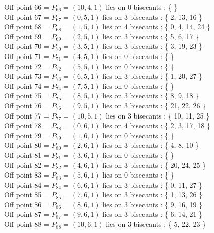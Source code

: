 \documentclass{article}
\begin{document}
{Off point 66 = $P_{66} = ( 10, 4, 1 )$ lies on 0 bisecants : \{  \}\\
Off point 67 = $P_{67} = ( 0, 5, 1 )$ lies on 3 bisecants : \{ 2, 13, 16 \}\\
Off point 68 = $P_{68} = ( 1, 5, 1 )$ lies on 4 bisecants : \{ 0, 4, 14, 24 \}\\
Off point 69 = $P_{69} = ( 2, 5, 1 )$ lies on 3 bisecants : \{ 5, 6, 17 \}\\
Off point 70 = $P_{70} = ( 3, 5, 1 )$ lies on 3 bisecants : \{ 3, 19, 23 \}\\
Off point 71 = $P_{71} = ( 4, 5, 1 )$ lies on 0 bisecants : \{  \}\\
Off point 72 = $P_{72} = ( 5, 5, 1 )$ lies on 0 bisecants : \{  \}\\
Off point 73 = $P_{73} = ( 6, 5, 1 )$ lies on 3 bisecants : \{ 1, 20, 27 \}\\
Off point 74 = $P_{74} = ( 7, 5, 1 )$ lies on 0 bisecants : \{  \}\\
Off point 75 = $P_{75} = ( 8, 5, 1 )$ lies on 3 bisecants : \{ 8, 9, 18 \}\\
Off point 76 = $P_{76} = ( 9, 5, 1 )$ lies on 3 bisecants : \{ 21, 22, 26 \}\\
Off point 77 = $P_{77} = ( 10, 5, 1 )$ lies on 3 bisecants : \{ 10, 11, 25 \}\\
Off point 78 = $P_{78} = ( 0, 6, 1 )$ lies on 4 bisecants : \{ 2, 3, 17, 18 \}\\
Off point 79 = $P_{79} = ( 1, 6, 1 )$ lies on 0 bisecants : \{  \}\\
Off point 80 = $P_{80} = ( 2, 6, 1 )$ lies on 3 bisecants : \{ 4, 8, 10 \}\\
Off point 81 = $P_{81} = ( 3, 6, 1 )$ lies on 0 bisecants : \{  \}\\
Off point 82 = $P_{82} = ( 4, 6, 1 )$ lies on 3 bisecants : \{ 20, 24, 25 \}\\
Off point 83 = $P_{83} = ( 5, 6, 1 )$ lies on 0 bisecants : \{  \}\\
Off point 84 = $P_{84} = ( 6, 6, 1 )$ lies on 3 bisecants : \{ 0, 11, 27 \}\\
Off point 85 = $P_{85} = ( 7, 6, 1 )$ lies on 3 bisecants : \{ 1, 13, 26 \}\\
Off point 86 = $P_{86} = ( 8, 6, 1 )$ lies on 3 bisecants : \{ 9, 16, 19 \}\\
Off point 87 = $P_{87} = ( 9, 6, 1 )$ lies on 3 bisecants : \{ 6, 14, 21 \}\\
Off point 88 = $P_{88} = ( 10, 6, 1 )$ lies on 3 bisecants : \{ 5, 22, 23 \}\\
}
\end{document}

